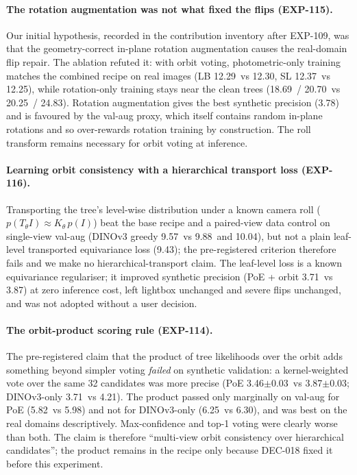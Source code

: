 \paragraph{The rotation augmentation was not what fixed the flips (EXP-115).}
Our initial hypothesis, recorded in the contribution inventory after EXP-109, was that the geometry-correct in-plane rotation augmentation causes the real-domain flip repair. The ablation refuted it: with orbit voting, photometric-only training matches the combined recipe on real images (LB 12.29\appDdeg\ vs 12.30\appDdeg, SL 12.37\appDdeg\ vs 12.25\appDdeg), while rotation-only training stays near the clean trees (18.69\appDdeg\ / 20.70\appDdeg\ vs 20.25\appDdeg\ / 24.83\appDdeg). Rotation augmentation gives the best synthetic precision (3.78\appDdeg) and is favoured by the val-aug proxy, which itself contains random in-plane rotations and so over-rewards rotation training by construction. The roll transform remains necessary for orbit voting at inference.

\paragraph{Learning orbit consistency with a hierarchical transport loss (EXP-116).}
Transporting the tree's level-wise distribution under a known camera roll ($p(T_\theta I)\approx K_\theta\,p(I)$) beat the base recipe and a paired-view data control on single-view val-aug (DINOv3 greedy 9.57\appDdeg\ vs 9.88\appDdeg\ and 10.04\appDdeg), but not a plain leaf-level transported equivariance loss (9.43\appDdeg); the pre-registered criterion therefore fails and we make no hierarchical-transport claim. The leaf-level loss is a known equivariance regulariser; it improved synthetic precision (PoE + orbit 3.71\appDdeg\ vs 3.87\appDdeg) at zero inference cost, left lightbox unchanged and severe flips unchanged, and was not adopted without a user decision.

\paragraph{The orbit-product scoring rule (EXP-114).}
The pre-registered claim that the product of tree likelihoods over the orbit adds something beyond simpler voting \emph{failed} on synthetic validation: a kernel-weighted vote over the same 32 candidates was more precise (PoE 3.46$\pm$0.03\appDdeg\ vs 3.87$\pm$0.03\appDdeg; DINOv3-only 3.71\appDdeg\ vs 4.21\appDdeg). The product passed only marginally on val-aug for PoE (5.82\appDdeg\ vs 5.98\appDdeg) and not for DINOv3-only (6.25\appDdeg\ vs 6.30\appDdeg), and was best on the real domains descriptively. Max-confidence and top-1 voting were clearly worse than both. The claim is therefore ``multi-view orbit consistency over hierarchical candidates''; the product remains in the recipe only because DEC-018 fixed it before this experiment.

